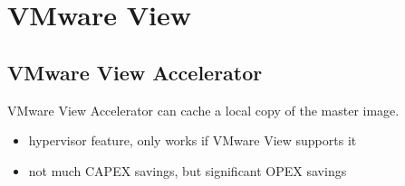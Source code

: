 \section{VMware View}

\subsection{VMware View Accelerator}

VMware View Accelerator can cache a local copy of the master image.

\begin{itemize}

\item hypervisor feature, only works if VMware View supports it
\item not much CAPEX savings, but significant OPEX savings

\end{itemize}
